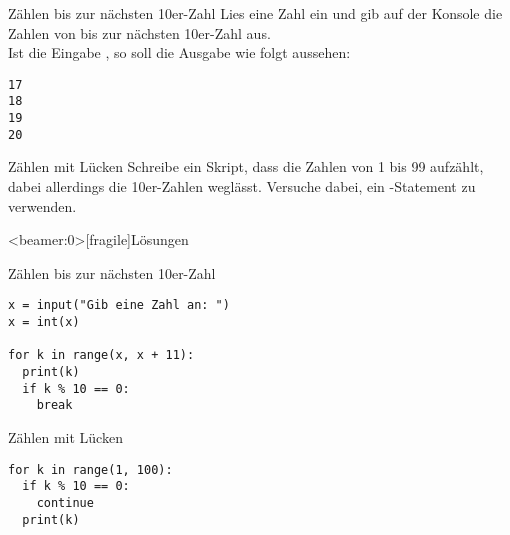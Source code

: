 \begin{fragile}[Übungen]

\begin{block}{Zählen bis zur nächsten 10er-Zahl}
	\vspace{2pt}
Lies eine Zahl  ein und gib auf der Konsole die Zahlen von  bis zur nächsten 10er-Zahl aus. 
\\
Ist die Eingabe , so soll die Ausgabe wie folgt aussehen: 
\begin{verbatim}
17
18
19
20
\end{verbatim}
\end{block}
	
\vspace{12pt}
\pause 

\begin{block}{Zählen mit Lücken}
	\vspace{2pt}
	Schreibe ein Skript, dass die Zahlen von 1 bis 99 aufzählt, dabei allerdings die 10er-Zahlen weglässt. Versuche dabei, ein -Statement zu verwenden.
\end{block}
\end{fragile}

\begin{frame}<beamer:0>[fragile]{Lösungen}

\begin{solutionblock}{Zählen bis zur nächsten 10er-Zahl}
\begin{verbatim}
x = input("Gib eine Zahl an: ")
x = int(x)

for k in range(x, x + 11):
  print(k)
  if k % 10 == 0:
    break
\end{verbatim}
\end{solutionblock}

\vspace{12pt}

\begin{solutionblock}{Zählen mit Lücken}
\begin{verbatim}
for k in range(1, 100):
  if k % 10 == 0:
    continue
  print(k)
\end{verbatim}
\end{solutionblock}

\end{frame}



